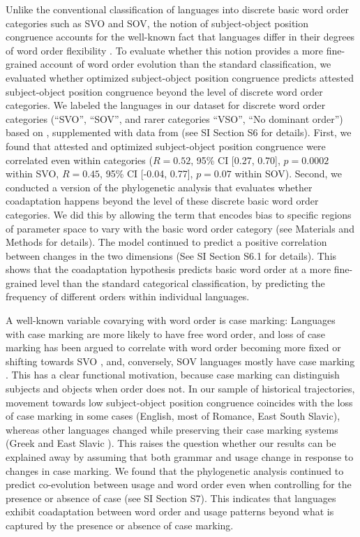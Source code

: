 \documentclass[9pt,twocolumn,twoside,lineno]{pnas-new}
\begin{document}
Unlike the conventional classification of languages into discrete basic word order categories such as SVO and SOV, the notion of subject-object position congruence accounts for the well-known fact that languages differ in their degrees of word order flexibility \citep{steele1978word}.
To evaluate whether this notion provides a more fine-grained account of word order evolution than the standard classification, we evaluated whether optimized subject-object position congruence predicts attested subject-object position congruence beyond the level of discrete word order categories.
We labeled the languages in our dataset for discrete word order categories (``SVO'', ``SOV'', and rarer categories ``VSO'', ``No dominant order'') based on \cite{wals-81}, supplemented with data from \cite{gell-mann-origin-2011} (see SI Section S6 for details).
First, we found that attested and optimized subject-object position congruence were correlated even within categories ($R = 0.52$, 95\% CI [0.27, 0.70], $p = 0.0002$ within SVO, $R=0.45$, 95\% CI [-0.04, 0.77], $p=0.07$ within SOV).  %
Second, we conducted a version of the phylogenetic analysis that evaluates whether coadaptation happens beyond the level of these discrete basic word order categories.
We did this by allowing the term that encodes bias to specific regions of parameter space to vary with the basic word order category  (see Materials and Methods for details).
The model continued to predict a positive correlation between changes in the two dimensions (See SI Section S6.1 for details). %
This shows that the coadaptation hypothesis predicts basic word order at a more fine-grained level than the standard categorical classification, by predicting the frequency of different orders within individual languages.


A well-known variable covarying with word order is case marking: Languages with case marking are more likely to have free word order, and loss of case marking has been argued to correlate with word order becoming more fixed or shifting towards SVO \citep{vennemann1974explanation}, and, conversely, SOV languages mostly have case marking \cite{greenberg-universals-1963}.
This has a clear functional motivation, because case marking can distinguish subjects and objects when order does not.
In our sample of historical trajectories, movement towards low subject-object position congruence coincides with the loss of case marking in some cases (English, most of Romance, East South Slavic), whereas other languages changed while preserving their case marking systems (Greek \citep{taylor1994change} and East Slavic \citep{matthews1960russian}).
This raises the question whether our results can be explained away by assuming that both grammar and usage change in response to changes in case marking.
We found that the phylogenetic analysis continued to predict co-evolution between usage and word order even when controlling for the presence or absence of case (see SI Section S7).
This indicates that languages exhibit coadaptation between word order and usage patterns beyond what is captured by the presence or absence of case marking.
\end{document}
